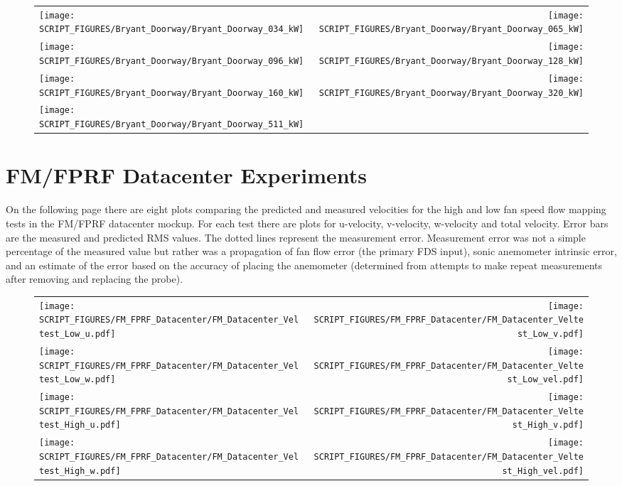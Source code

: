 \begin{figure}[p]
\begin{tabular*}{\textwidth}{l@{\extracolsep{\fill}}r}
\texttt{[image: SCRIPT\_FIGURES/Bryant\_Doorway/Bryant\_Doorway\_034\_kW]} &
\texttt{[image: SCRIPT\_FIGURES/Bryant\_Doorway/Bryant\_Doorway\_065\_kW]} \\
\texttt{[image: SCRIPT\_FIGURES/Bryant\_Doorway/Bryant\_Doorway\_096\_kW]} &
\texttt{[image: SCRIPT\_FIGURES/Bryant\_Doorway/Bryant\_Doorway\_128\_kW]} \\
\texttt{[image: SCRIPT\_FIGURES/Bryant\_Doorway/Bryant\_Doorway\_160\_kW]} &
\texttt{[image: SCRIPT\_FIGURES/Bryant\_Doorway/Bryant\_Doorway\_320\_kW]} \\
\texttt{[image: SCRIPT\_FIGURES/Bryant\_Doorway/Bryant\_Doorway\_511\_kW]} &
\end{tabular*}
\label{Bryant_Doorway}
\end{figure}


\clearpage

\section{FM/FPRF Datacenter Experiments}

On the following page there are eight plots comparing the predicted and measured velocities for the high and low fan speed flow mapping tests in the FM/FPRF datacenter mockup. For each test there are plots for u-velocity, v-velocity, w-velocity and total velocity. Error bars are the measured and predicted RMS values. The dotted lines represent the measurement error. Measurement error was not a simple percentage of the measured value but rather was a propagation of fan flow error (the primary FDS input), sonic anemometer intrinsic error, and an estimate of the error based on the accuracy of placing the anemometer (determined from attempts to make repeat measurements after removing and replacing the probe).

\begin{figure}[p]
\begin{tabular*}{\textwidth}{l@{\extracolsep{\fill}}r}
\texttt{[image: SCRIPT\_FIGURES/FM\_FPRF\_Datacenter/FM\_Datacenter\_Veltest\_Low\_u.pdf]} &
\texttt{[image: SCRIPT\_FIGURES/FM\_FPRF\_Datacenter/FM\_Datacenter\_Veltest\_Low\_v.pdf]} \\
\texttt{[image: SCRIPT\_FIGURES/FM\_FPRF\_Datacenter/FM\_Datacenter\_Veltest\_Low\_w.pdf]} &
\texttt{[image: SCRIPT\_FIGURES/FM\_FPRF\_Datacenter/FM\_Datacenter\_Veltest\_Low\_vel.pdf]} \\
\texttt{[image: SCRIPT\_FIGURES/FM\_FPRF\_Datacenter/FM\_Datacenter\_Veltest\_High\_u.pdf]} &
\texttt{[image: SCRIPT\_FIGURES/FM\_FPRF\_Datacenter/FM\_Datacenter\_Veltest\_High\_v.pdf]} \\
\texttt{[image: SCRIPT\_FIGURES/FM\_FPRF\_Datacenter/FM\_Datacenter\_Veltest\_High\_w.pdf]} &
\texttt{[image: SCRIPT\_FIGURES/FM\_FPRF\_Datacenter/FM\_Datacenter\_Veltest\_High\_vel.pdf]}
\end{tabular*}
\label{FM_Datacenter_Flow_Mapping}
\end{figure}

